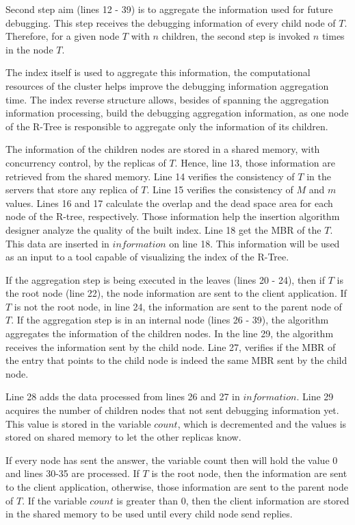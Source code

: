 	Second step aim (lines 12 - 39) is to aggregate the information used for future debugging. This step receives the debugging information of every child node of $T$. Therefore, for a given node $T$ with $n$ children, the second step is invoked $n$ times in the node $T$.

	The index itself is used to aggregate this information, the computational resources of the cluster helps improve the debugging information aggregation time. The index reverse structure allows, besides of spanning the aggregation information processing, build the debugging aggregation information, as one node of the R-Tree is responsible to aggregate only the information of its children. 

	The information of the children nodes are stored in a shared memory, with concurrency control, by the replicas of $T$. Hence, line 13, those information are retrieved from the shared memory. Line 14 verifies the consistency of $T$ in the servers that store any replica of $T$. Line 15 verifies the consistency of $M$ and $m$ values. Lines 16 and 17 calculate the overlap and the dead space area for each node of the R-tree, respectively. Those information help the insertion algorithm designer analyze the quality of the built index. Line 18 get the MBR of the $T$. This data are inserted in $information$ on line 18. This information will be used as an input to a tool capable of visualizing the index of the R-Tree.
	
	If the aggregation step is being executed in the leaves (lines 20 - 24), then if  $T$ is the root node (line 22), the node information are sent to the client application. If $T$ is not the root node, in line 24, the information are sent to the parent node of $T$. If the aggregation step is in an internal node (lines 26 - 39), the algorithm aggregates the information of the children nodes. In the line 29, the algorithm receives the information sent by the child node. Line 27, verifies if the MBR of the entry that points to the child node is indeed the same MBR sent by the child node.
	
	Line 28 adds the data processed from lines 26 and 27 in $information$. Line 29 acquires the number of children nodes that not sent debugging information yet. This value is stored in the variable $count$, which is decremented and the values is stored on shared memory to let the other replicas know.
	
	If every node has sent the answer, the variable count then will hold the value 0 and lines 30-35 are processed. If $T$ is the root node, then the information are sent to the client application, otherwise, those information are sent to the parent node of $T$. If the variable $count$ is greater than 0, then the client information are stored in the shared memory to be used until every child node send replies.	
	
